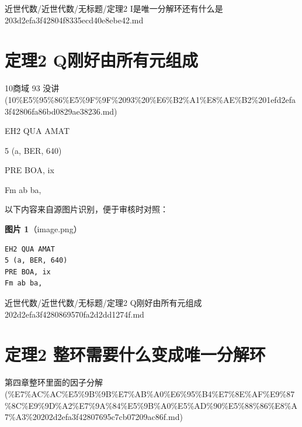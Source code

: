 \begin{note}[来源路径]

近世代数/近世代数/无标题/定理2 I是唯一分解环还有什么是 203d2efa3f42804f8335ecd40e8ebe42.md

\end{note}

\section*{定理2 Q刚好由所有元组成}

\begin{note}[来源上级主题]

10商域 93 没讲 (10\%E5\%95\%86\%E5\%9F\%9F\%2093\%20\%E6\%B2\%A1\%E8\%AE\%B2\%201efd2efa3f42806fa86bd0829ae38236.md)

\end{note}

\begin{theorem}[定理2 Q刚好由所有元组成]

EH2 QUA AMAT

5 (a, BER, 640)

PRE BOA, ix

Fm ab ba,

\end{theorem}

\begin{note}
以下内容来自源图片识别，便于审核时对照：

\textbf{图片 1}（image.png）
\begin{Verbatim}[fontsize=\small]
EH2 QUA AMAT
5 (a, BER, 640)
PRE BOA, ix
Fm ab ba,
\end{Verbatim}

\end{note}

\begin{note}[来源路径]

近世代数/近世代数/无标题/定理2 Q刚好由所有元组成 202d2efa3f4280869570fa2d2dd1274f.md

\end{note}

\section*{定理2 整环需要什么变成唯一分解环}

\begin{note}[来源上级主题]

第四章整环里面的因子分解 (\%E7\%AC\%AC\%E5\%9B\%9B\%E7\%AB\%A0\%E6\%95\%B4\%E7\%8E\%AF\%E9\%87\%8C\%E9\%9D\%A2\%E7\%9A\%84\%E5\%9B\%A0\%E5\%AD\%90\%E5\%88\%86\%E8\%A7\%A3\%20202d2efa3f42807695c7cb07209ac86f.md)

\end{note}

